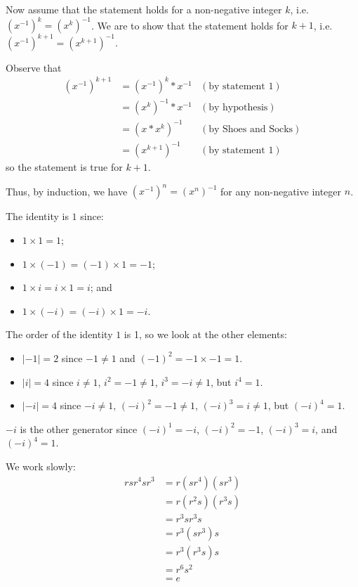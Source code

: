 \begin{questions}
    Now assume that the statement holds for a non-negative integer $k$, i.e. $(x^{-1})^k = (x^k)^{-1}$. We are to show that the statement holds for $k+1$, i.e. $(x^{-1})^{k+1} = (x^{k+1})^{-1}$.

    Observe that
    \begin{align*}
        (x^{-1})^{k+1} &= (x^{-1})^k \ast x^{-1} & (\text{by statement 1})\\
        &= (x^k)^{-1} \ast x^{-1} & (\text{by hypothesis})\\
        &= (x\ast x^k)^{-1} & (\text{by Shoes and Socks})\\
        &= (x^{k+1})^{-1} & (\text{by statement 1})
    \end{align*}
    so the statement is true for $k+1$.

    Thus, by induction, we have $(x^{-1})^n = (x^n)^{-1}$ for any non-negative integer $n$.

    \item \begin{partquestions}{\roman*}
        \item The identity is $1$ since:
        \begin{itemize}
            \item $1 \times 1 = 1$;
            \item $1 \times (-1) = (-1) \times 1 = -1$;
            \item $1 \times i = i \times 1 = i$; and
            \item $1 \times (-i) = (-i) \times 1 = -i$.
        \end{itemize}
        \item The order of the identity $1$ is 1, so we look at the other elements:
        \begin{itemize}
            \item $|-1| = 2$ since $-1 \neq 1$ and $(-1)^2 = -1 \times -1 = 1$.
            \item $|i| = 4$ since $i \neq 1$, $i^2 = -1 \neq 1$, $i^3 = -i \neq 1$, but $i^4 = 1$.
            \item $|-i| = 4$ since $-i \neq 1$, $(-i)^2 = -1 \neq 1$, $(-i)^3 = i \neq 1$, but $(-i)^4 = 1$.
        \end{itemize}
    \end{partquestions}

    \item $-i$ is the other generator since $(-i)^1 = -i$, $(-i)^2 = -1$, $(-i)^3 = i$, and $(-i)^4 = 1$.

    \item We work slowly:
    \begin{align*}
        rsr^4sr^3 &= r(sr^4)(sr^3)\\
        &= r(r^2s)(r^3s)\\
        &= r^3sr^3s\\
        &= r^3(sr^3)s\\
        &= r^3(r^3s)s\\
        &= r^6s^2\\
        &= e
    \end{align*}
\end{questions}

